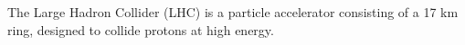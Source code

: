 The Large Hadron Collider (LHC) is a particle accelerator consisting of a 17 km ring, designed to collide protons at high energy.